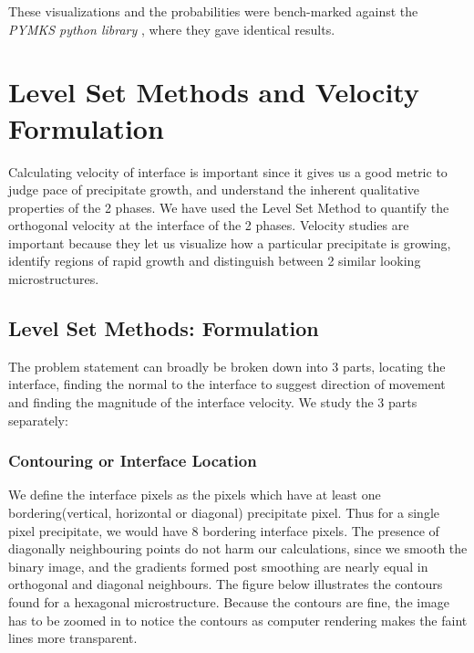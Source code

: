 \documentclass[12pt, a4paper]{report}
\begin{document}
These visualizations and the probabilities were bench-marked against the \textit{PYMKS python library} \cite{27wheeler2014pymks}, where they gave identical results. 

\section{Level Set Methods and Velocity Formulation}

Calculating velocity of interface is important since it gives us a good metric to judge pace of precipitate growth, and understand the inherent qualitative properties of the 2 phases. We have used the Level Set Method \cite{23sethian1999level} to quantify the orthogonal velocity at the interface of the 2 phases. Velocity studies are important because they let us visualize how a particular precipitate is growing, identify regions of rapid growth and distinguish between 2 similar looking microstructures.
 
\subsection{Level Set Methods: Formulation}
The problem statement can broadly be broken down into 3 parts, locating the interface, finding the normal to the interface to suggest direction of movement and finding the magnitude of the interface velocity. We study the 3 parts separately:

\subsubsection{Contouring or Interface Location}
We define the interface pixels as the pixels which have at least one bordering(vertical, horizontal or diagonal) precipitate pixel. Thus for a single pixel precipitate, we would have 8 bordering interface pixels. The presence of diagonally neighbouring points do not harm our calculations, since we smooth the binary image, and the gradients formed post smoothing are nearly equal in orthogonal and diagonal neighbours. The figure below illustrates the contours found for a hexagonal microstructure. Because the contours are fine, the image has to be zoomed in to notice the contours as computer rendering makes the faint lines more transparent.
\end{document}
